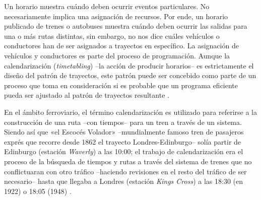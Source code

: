 \documentclass[draft,12pt,headsepline,footsepline,paper=letter]{scrreprt}
\begin{document}
Un horario muestra cuándo deben ocurrir eventos particulares. No necesariamente implica una asignación de recursos. Por ende, un horario publicado de trenes o autobuses muestra cuándo deben ocurrir las salidas para una o más rutas distintas, sin embargo, no nos dice cuáles vehículos o conductores han de ser asignados a trayectos en específico. La asignación de vehículos y conductores es parte del proceso de programación. Aunque la calendarización (\textit{timetabling}) –la acción de producir horarios– es estrictamente el diseño del patrón de trayectos, este patrón puede ser concebido como parte de un proceso que toma en consideración si es probable que un programa eficiente pueda ser ajustado al patrón de trayectos resultante \cite[p.~48]{wren95scheduling-timetabling}.

En el ámbito ferroviario, el término calendarización es utilizado para referirse a la construcción de una ruta –con tiempos– para un tren a través de un sistema. Siendo así que «el Escocés Volador» –mundialmente famoso tren de pasajeros exprés que recorre desde 1862 el trayecto Londres-Edinburgo– solía partir de Edinburgo (estación \textit{Waverly}) a las 10:00; el trabajo de calendarización era el proceso de la búsqueda de tiempos y rutas a través del sistema de trenes que no conflictuaran con otro tráfico –haciendo revisiones en el resto del tráfico de ser necesario– hasta que llegaba a Londres (estación \textit{Kings Cross}) a las 18:30 (en 1922) o 18:05 (1948) \citep[p.~48, 49]{wren95scheduling-timetabling}.

\end{document}
